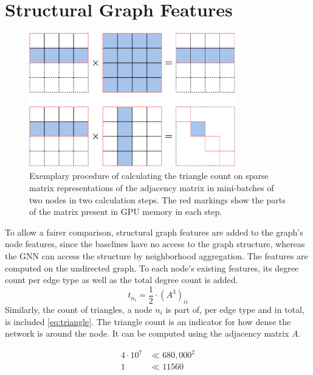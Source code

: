  \section{Structural Graph Features}
  \begin{figure}
    \centering
    \includegraphics[width=0.8\textwidth]{img/sparsemul.drawio (1).pdf}
    \caption[Triangle count matrix calculation]{Exemplary procedure of calculating the triangle count on sparse matrix representations of the adjacency matrix in mini-batches of two nodes in two calculation steps. The red markings show the parts of the matrix present in GPU memory in each step.}
    \label{fig:computetriangle}
\end{figure}
To allow a fairer comparison, structural graph features are added to the graph's node features, since the baselines have no access to the graph structure, whereas the GNN can access the structure by neighborhood aggregation. The features are computed on the undirected graph. To each node's existing features, its degree count per edge type as well as the total degree count is added. 
 \begin{equation}
 t_{n_i} = \frac{1}{2}\cdot( A^3)_{ii} \label{eq:triangle}
 \end{equation}
 Similarly, the count of triangles, a node $n_i$  is part of, per edge type and in total, is included \eqref{eq:triangle}. The triangle count is an indicator for how dense the network is around the node. It can be computed using the adjacency matrix $A$. 
 
  \begin{equation}
\begin{aligned}
 4\cdot 10^7 &\ll 680,000^2\\
 1 &\ll 11560\\ \label{eq:smaller}
\end{aligned}
 \end{equation}
 
